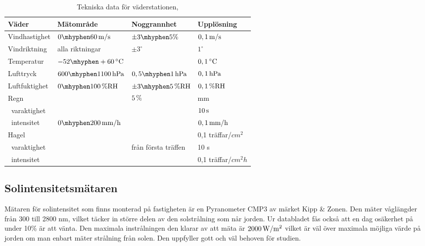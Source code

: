 \begin{table}[htdp]
\caption{Tekniska data för väderstationen, \cite{datasheet_weathertransmitter}}
\begin{center}
\begin{tabular}{|l | l l l|}
\hline
\textbf{Väder} & \textbf{Mätområde} %
 & \textbf{Noggrannhet} %
 & \textbf{Upplösning} \\ %
\hline
\rule{0pt}{3ex}Vindhastighet & $\unit[0\mhyphen 60]{m/s}$ & $\pm 3\mhyphen 5\%$ & $\unit[0,1]{m/s}$ \\ 
\rule{0pt}{3ex}Vindriktning & alla riktningar & $\pm 3^{\circ}$ & $1^{\circ}$ \\
\rule{0pt}{3ex}Temperatur & $\unit[-52\mhyphen +60]{^{\circ}C}$ & & $\unit[0,1]{^{\circ}C}$ \\
\rule{0pt}{3ex}Lufttryck & $\unit[600\mhyphen 1100]{hPa}$ & $\unit[0,5\mhyphen 1]{hPa}$ & $\unit[0,1]{hPa}$ \\
\rule{0pt}{3ex}Luftfuktighet & $\unit[0\mhyphen 100]{\%RH}$ & $\unit[\pm3\mhyphen 5]{\%RH}$ & $\unit[0,1]{\%RH}$ \\
\rule{0pt}{3ex}Regn &  & $\unit[5]{\%}$ & \unit[0,01]{mm} \\
~varaktighet & & & $\unit[10]{s}$\\
~intensitet & $\unit[0\mhyphen 200]{mm/h}$ & & $\unit[0,1]{mm/h}$ \\
\rule{0pt}{3ex}Hagel &  &  & 0,1 träffar/$\unit{cm^2}$ \\
~varaktighet & & från första träffen & 10 s\\
~intensitet & & & 0,1 träffar/$\unit{cm^2h}$\\
\hline
\end{tabular}
\end{center}
\label{tbl:weathertransmitter}
\end{table}

\subsection{Solintensitetsmätaren}\label{subsec:sunmeter}
Mätaren för solintensitet som finns monterad på fastigheten är en Pyranometer CMP3 av märket Kipp \& Zonen. Den mäter våglängder från 300 till 2800 nm, vilket täcker in större delen av den solstrålning som når jorden. Ur databladet fås också att en dag osäkerhet på under 10\% är att vänta. Den maximala instrålningen den klarar av att mäta är $\unit[2000]{W/m^2}$ vilket är väl över maximala möjliga värde på jorden om man enbart mäter strålning från solen. Den uppfyller gott och väl behoven för studien.\cite{datasheet_sun}



